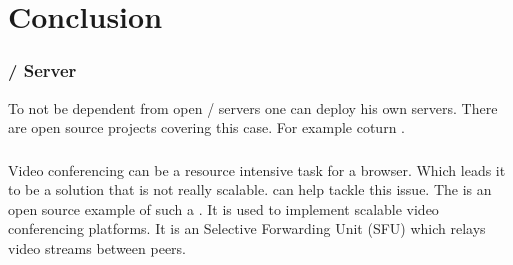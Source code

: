 \clearpage
\chapter{Conclusion}

\subsection{ /  Server}
To not be dependent from open / servers one can deploy his own servers. There are open source projects covering this case. For example coturn \cite{coturn}.

\subsection{}
Video conferencing can be a resource intensive task for a browser. Which leads it to be a solution that is not really scalable.  can help tackle this issue. The   is an open source example of such a . It is used to implement scalable video conferencing platforms. It is an Selective Forwarding Unit (SFU) which relays video streams between peers.
